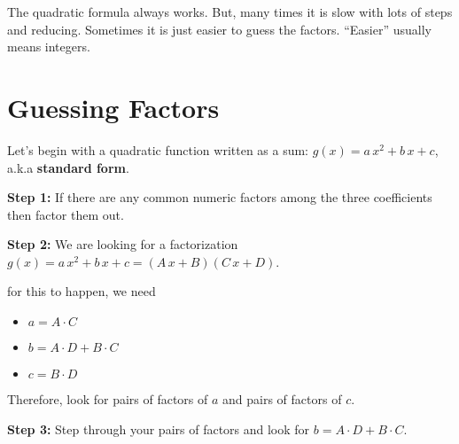 \documentclass{ximera}
\begin{document}
The quadratic formula always works.  But, many times it is slow with lots of steps and reducing.  Sometimes it is just easier to guess the factors.  ``Easier'' usually means integers.




















\section{Guessing Factors}


Let's begin with a quadratic function written as a sum: $g(x) = a \, x^2 + b \, x + c$, a.k.a \textbf{standard form}.  


\textbf{\textcolor{blue!75!black}{Step 1:}} If there are any common numeric factors among the three coefficients then factor them out.


\textbf{\textcolor{blue!75!black}{Step 2:}} We are looking for a factorization $g(x) = a \, x^2 + b \, x + c = (A \, x + B)(C \, x + D)$.

for this to happen, we need

\begin{itemize}
\item $a = A \cdot C $
\item $b = A\cdot D + B \cdot C$
\item $c = B \cdot D$
\end{itemize}

Therefore, look for pairs of factors of $a$ and pairs of factors of $c$.






\textbf{\textcolor{blue!75!black}{Step 3:}} Step through your pairs of factors and look for $b = A \cdot D + B \cdot C$.
\end{document}
